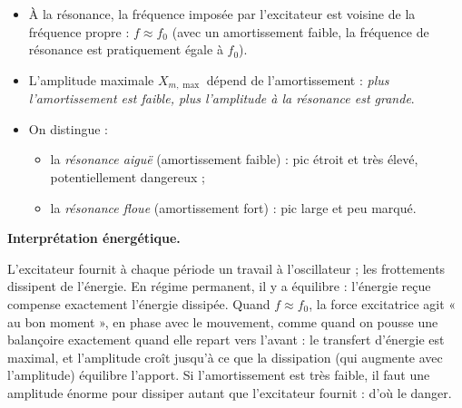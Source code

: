 \documentclass[11pt]{article}
\begin{document}
\begin{propriete}
\begin{itemize}
\item À la résonance, la fréquence imposée par l'excitateur est voisine de la fréquence propre : $f \approx f_0$ (avec un amortissement faible, la fréquence de résonance est pratiquement égale à $f_0$).
\item L'amplitude maximale $X_{m,\max}$ dépend de l'amortissement : \emph{plus l'amortissement est faible, plus l'amplitude à la résonance est grande}.
\item On distingue :
\begin{itemize}
\item la \emph{résonance aiguë} (amortissement faible) : pic étroit et très élevé, potentiellement dangereux ;
\item la \emph{résonance floue} (amortissement fort) : pic large et peu marqué.
\end{itemize}
\end{itemize}
\end{propriete}

\textbf{Interprétation énergétique.}\par

L'excitateur fournit à chaque période un travail à l'oscillateur ; les frottements dissipent de l'énergie. En régime permanent, il y a équilibre : l'énergie reçue compense exactement l'énergie dissipée. Quand $f \approx f_0$, la force excitatrice agit « au bon moment », en phase avec le mouvement, comme quand on pousse une balançoire exactement quand elle repart vers l'avant : le transfert d'énergie est maximal, et l'amplitude croît jusqu'à ce que la dissipation (qui augmente avec l'amplitude) équilibre l'apport. Si l'amortissement est très faible, il faut une amplitude énorme pour dissiper autant que l'excitateur fournit : d'où le danger.
\end{document}
